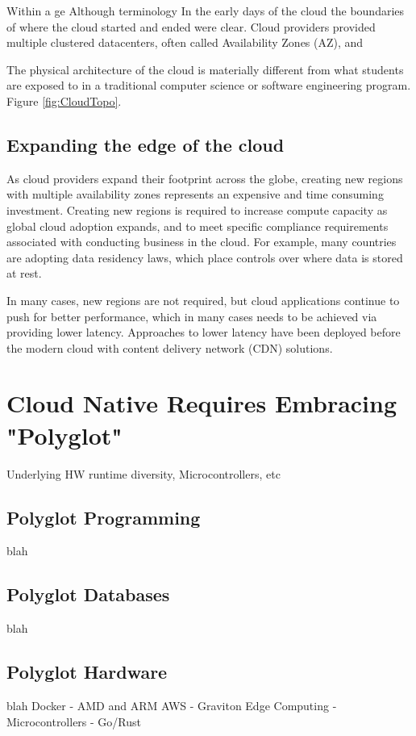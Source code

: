 \documentclass[conference]{IEEEconf}
\begin{document}
Within a ge
Although terminology In the early days of the cloud the boundaries of where the cloud started and ended were clear. Cloud providers provided multiple clustered datacenters, often called Availability Zones (AZ), and  

The physical architecture of the cloud is materially different from what students are exposed to in a traditional computer science or software engineering program.  Figure \ref{fig:CloudTopo}.

\subsection{Expanding the edge of the cloud}
As cloud providers expand their footprint across the globe, creating new regions with multiple availability zones represents an expensive and time consuming investment. Creating new regions is required to increase compute capacity as global cloud adoption expands, and to meet specific compliance requirements associated with conducting business in the cloud. For example, many countries are adopting data residency laws, which place controls over where data is stored at rest. 

In many cases, new regions are not required, but cloud applications continue to push for better performance, which in many cases needs to be achieved via providing lower latency.  Approaches to lower latency have been deployed before the modern cloud with content delivery network (CDN)\cite{CDN} solutions. 

\section{Cloud Native Requires Embracing "Polyglot"}
Underlying HW runtime diversity, Microcontrollers, etc
\subsection{Polyglot Programming}
blah

\subsection{Polyglot Databases}
blah

\subsection{Polyglot Hardware}
blah
Docker - AMD and ARM
AWS - Graviton
Edge Computing - Microcontrollers - Go/Rust
\end{document}
